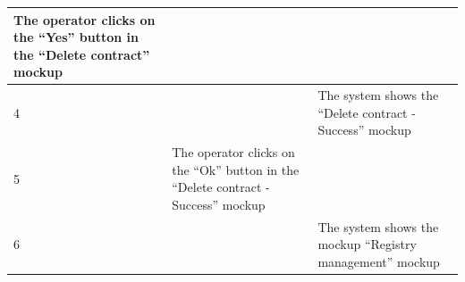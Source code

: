 {{{\begin{table}[h]
\begin{tabular}{|p{2cm}|p{6cm}|p{6cm}|}
				\vspace{1mm} The operator clicks on the “Yes”  button  in the “Delete contract”  mockup \vspace{1mm} & 
				\vspace{1mm} \vspace{1mm} \\
			\hline
				\vspace{1mm} 4 \vspace{1mm} &
				\vspace{1mm} \vspace{1mm} & 
				\vspace{1mm} The system shows the “Delete contract - Success”  mockup \vspace{1mm} \\
			\hline
				\vspace{1mm} 5 \vspace{1mm} &
				\vspace{1mm} The operator clicks on the “Ok”  button  in the “Delete contract - Success”  mockup\vspace{1mm} & 
				\vspace{1mm} \vspace{1mm} \\
			\hline
				\vspace{1mm} 6 \vspace{1mm} &
				\vspace{1mm} \vspace{1mm} & 
				\vspace{1mm} The system shows the mockup “Registry management” mockup \vspace{1mm} \\
			\hline	
			\end{tabular}
			\end{table}
			
}}}
